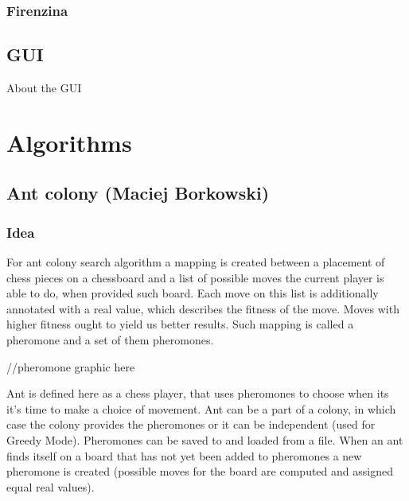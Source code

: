 \documentclass[pdftex]{article}
\begin{document}
\subsubsection{Firenzina}
\label{sec:firenzina}

\subsection{GUI}
\label{sec:uci}

About the GUI

\section{Algorithms}
\label{sec:project}

\subsection{Ant colony (Maciej Borkowski)}
\label{sec:ant}

\subsubsection{Idea}
For ant colony search algorithm a mapping is created between a placement of chess pieces on a chessboard and a list of possible moves the current player is able to do, when provided such board. Each move on this list is additionally annotated with a real value, which describes the fitness of the move. Moves with higher fitness ought to yield us better results. Such mapping is called a pheromone and a set of them pheromones.

//pheromone graphic here

Ant is defined here as a chess player, that uses pheromones to choose when its it's time to make a choice of movement. Ant can be a part of a colony, in which case the colony provides the pheromones or it can be independent (used for Greedy Mode). Pheromones can be saved to and loaded from a file. When an ant finds itself on a board that has not yet been added to pheromones a new pheromone is created (possible moves for the board are computed and assigned equal real values).
\end{document}
